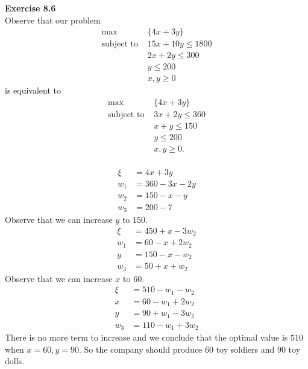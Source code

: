 \documentclass[letterpaper,12pt]{article}
\theoremstyle{definition}
\begin{document}
\noindent\textbf{Exercise 8.6} \\
Observe that our problem
\begin{align*}
  \max &\{4x + 3y\} \\
  \text{subject to } &15x+10y \leq 1800 \\
  &2x+2y \leq 300 \\
  &y\leq 200 \\
  &x, y \geq 0
\end{align*}
is equivalent to
\begin{align*}
  \max &\{4x + 3y\} \\
  \text{subject to } &3x+2y \leq 360 \\
  &x+y \leq 150 \\
  &y\leq 200 \\
  &x, y \geq 0.
\end{align*} \\
\begin{align*}
  \xi &= 4x+3y \\
  w_1 &= 360 -3x-2y \\
  w_2 &= 150 -x-y \\
  w_3 &= 200 -7
\end{align*}
Observe that we can increase $y \text{ to } 150.$
\begin{align*}
  \xi &= 450 + x - 3w_2 \\
  w_1 &= 60 -x +2w_2 \\
  y &= 150 -x -w_2 \\
  w_3 &= 50 + x + w_2
\end{align*}
Observe that we can increase $x \text{ to } 60.$
\begin{align*}
  \xi &= 510 - w_1 - w_2 \\
  x &= 60 - w_1 + 2 w_2 \\
  y &= 90 + w_1 - 3w_2 \\
  w_3 &= 110 - w_1 + 3w_2
\end{align*}
There is no more term to increase and we conclude that the optimal value is $510$ when $x = 60, y =90.$ So the company should produce 60 toy soldiers and 90 toy dolls. \\
\end{document}
